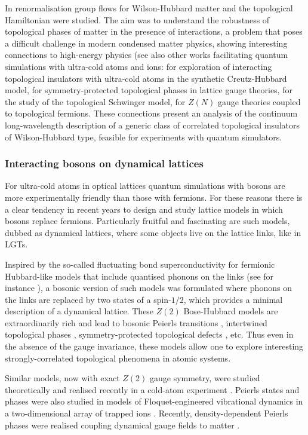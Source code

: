 \documentclass[epj,final]{svjour}
\begin{document}
In \cite{TRS18} renormalisation group flows for Wilson-Hubbard matter and the topological Hamiltonian were studied. The aim was to understand the robustness of topological phases of matter in the presence of interactions, a problem that poses a difficult challenge in modern condensed matter physics, showing interesting connections to high-energy physics (see also other works facilitating quantum  simulations with ultra-cold atoms and ions: \cite{JPR16} for exploration of  interacting topological insulators with ultra-cold atoms in the synthetic Creutz-Hubbard model, \cite{MVE18} for symmetry-protected topological phases in lattice gauge theories, \cite{MVE19} for the study of the topological Schwinger model, \cite{GDG19} for $Z(N)$ gauge theories coupled to topological fermions. These connections present an analysis of the continuum long-wavelength description of a generic class of correlated topological insulators of Wilson-Hubbard type, feasible for experiments with quantum simulators. 

\subsubsection{Interacting bosons on dynamical lattices \cite{GGD18,GDG18,GDG19,CZL19}}

For ultra-cold atoms in optical lattices quantum simulations with bosons are more experimentally friendly than those with fermions. For these reasons there is a clear tendency in recent years to design and study lattice models in which bosons replace fermions. Particularly fruitful and fascinating are such models, dubbed as dynamical lattices, where some objects live on the lattice links, like in LGTs. 

Inspired by the so-called fluctuating bond superconductivity for fermionic Hubbard-like models that include quantised phonons on the links (see for instance \cite{JDC19}), a bosonic version of such models was formulated where phonons on the links are replaced by two states of a spin-$1/2$, which provides a minimal description of a dynamical lattice. These $Z(2)$ Bose-Hubbard models are extraordinarily rich and lead to bosonic Peierls transitions \cite{GGD18}, intertwined topological phases \cite{GDG18, GBG19}, symmetry-protected topological defects \cite{GDG19}, etc. Thus even in the absence of the gauge invariance, these models allow one to explore interesting strongly-correlated topological phenomena in atomic systems.

Similar models, now with exact $Z(2)$ gauge symmetry, were studied theoretically \cite{BSA18} and realised recently in a cold-atom experiment \cite{SGB19}. Peierls states and phases were also studied in models of Floquet-engineered vibrational dynamics in a two-dimensional array of trapped ions \cite{KHW19}. Recently, density-dependent Peierls phases were realised coupling dynamical gauge fields to matter \cite{Gorg:2018xyc}. 
\end{document}
